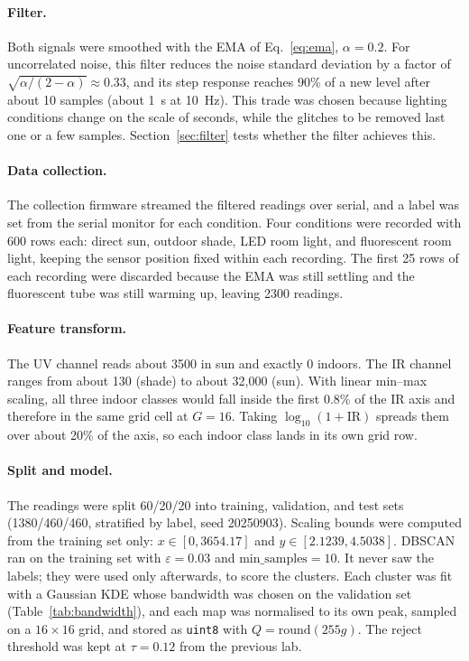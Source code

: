 \documentclass[10pt,a4paper,twocolumn]{article}
\begin{document}
\paragraph{Filter.} Both signals were smoothed with the EMA of Eq.~\eqref{eq:ema}, $\alpha = 0.2$. For uncorrelated noise, this filter reduces the noise standard deviation by a factor of $\sqrt{\alpha/(2-\alpha)} \approx 0.33$, and its step response reaches 90\% of a new level after about 10 samples (about 1~s at 10~Hz). This trade was chosen because lighting conditions change on the scale of seconds, while the glitches to be removed last one or a few samples. Section~\ref{sec:filter} tests whether the filter achieves this.

\paragraph{Data collection.} The collection firmware streamed the filtered readings over serial, and a label was set from the serial monitor for each condition. Four conditions were recorded with 600 rows each: direct sun, outdoor shade, LED room light, and fluorescent room light, keeping the sensor position fixed within each recording. The first 25 rows of each recording were discarded because the EMA was still settling and the fluorescent tube was still warming up, leaving 2300 readings.

\paragraph{Feature transform.} The UV channel reads about 3500 in sun and exactly 0 indoors. The IR channel ranges from about 130 (shade) to about 32{,}000 (sun). With linear min--max scaling, all three indoor classes would fall inside the first 0.8\% of the IR axis and therefore in the same grid cell at $G=16$. Taking $\log_{10}(1+\mathrm{IR})$ spreads them over about 20\% of the axis, so each indoor class lands in its own grid row.

\paragraph{Split and model.} The readings were split 60/20/20 into training, validation, and test sets (1380/460/460, stratified by label, seed 20250903). Scaling bounds were computed from the training set only:
$x \in [0, 3654.17]$ and $y \in [2.1239, 4.5038]$.
DBSCAN ran on the training set with $\varepsilon = 0.03$ and $\mathrm{min\_samples} = 10$. It never saw the labels; they were used only afterwards, to score the clusters. Each cluster was fit with a Gaussian KDE whose bandwidth was chosen on the validation set (Table~\ref{tab:bandwidth}), and each map was normalised to its own peak, sampled on a $16\times16$ grid, and stored as \texttt{uint8} with $Q=\mathrm{round}(255g)$. The reject threshold was kept at $\tau = 0.12$ from the previous lab.
\end{document}
